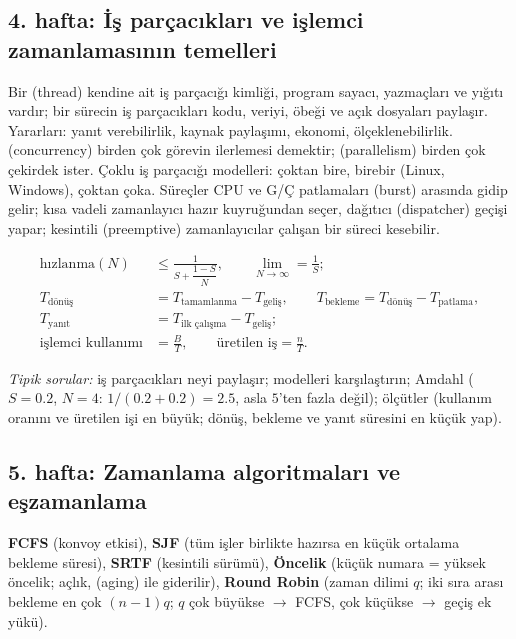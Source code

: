 \subsection{4. hafta: İş parçacıkları ve işlemci zamanlamasının temelleri}
Bir  (thread) kendine ait iş parçacığı kimliği, program sayacı, yazmaçları ve yığıtı vardır; bir sürecin iş parçacıkları kodu, veriyi, öbeği ve açık dosyaları paylaşır. Yararları: yanıt verebilirlik, kaynak paylaşımı, ekonomi, ölçeklenebilirlik.  (concurrency) birden çok görevin ilerlemesi demektir;  (parallelism) birden çok çekirdek ister. Çoklu iş parçacığı modelleri: çoktan bire, birebir (Linux, Windows), çoktan çoka. Süreçler CPU ve G/Ç patlamaları (burst) arasında gidip gelir; kısa vadeli zamanlayıcı hazır kuyruğundan seçer, dağıtıcı (dispatcher) geçişi yapar; kesintili (preemptive) zamanlayıcılar çalışan bir süreci kesebilir.
\begin{example}
\begin{align*}
\text{hızlanma}(N) &\le \frac{1}{S + \dfrac{1-S}{N}}, \qquad \lim_{N\to\infty} = \frac{1}{S};\\
T_{\text{dönüş}} &= T_{\text{tamamlanma}} - T_{\text{geliş}},\qquad
T_{\text{bekleme}} = T_{\text{dönüş}} - T_{\text{patlama}},\\
T_{\text{yanıt}} &= T_{\text{ilk çalışma}} - T_{\text{geliş}};\\
\text{işlemci kullanımı} &= \frac{B}{T}, \qquad \text{üretilen iş} = \frac{n}{T}.
\end{align*}
\end{example}
\textit{Tipik sorular:} iş parçacıkları neyi paylaşır; modelleri karşılaştırın; Amdahl ($S = 0.2$, $N = 4$: $1/(0.2+0.2) = 2.5$, asla $5$'ten fazla değil); ölçütler (kullanım oranını ve üretilen işi en büyük; dönüş, bekleme ve yanıt süresini en küçük yap).

\subsection{5. hafta: Zamanlama algoritmaları ve eşzamanlama}
\textbf{FCFS} (konvoy etkisi), \textbf{SJF} (tüm işler birlikte hazırsa en küçük ortalama bekleme süresi), \textbf{SRTF} (kesintili sürümü), \textbf{Öncelik} (küçük numara = yüksek öncelik; açlık,  (aging) ile giderilir), \textbf{Round Robin} (zaman dilimi $q$; iki sıra arası bekleme en çok $(n-1)q$; $q$ çok büyükse $\to$ FCFS, çok küçükse $\to$ geçiş ek yükü).

